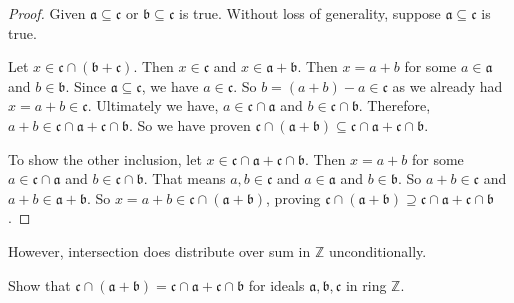 \begin{proof}
    Given \(\mathfrak{a} \subseteq \mathfrak{c}\) or \(\mathfrak{b} \subseteq \mathfrak{c}\) is true. Without loss of generality, suppose  \(\mathfrak{a} \subseteq \mathfrak{c}\) is true.

    Let \(x \in \mathfrak{c}  \cap (\mathfrak{b} + \mathfrak{c})\). Then \(x \in \mathfrak{c}\) and \(x \in \mathfrak{a} + \mathfrak{b}\). Then \(x = a + b\) for some  \(a \in \mathfrak{a}\) and \(b \in \mathfrak{b}\). Since \(\mathfrak{a} \subseteq \mathfrak{c}\), we have \(a \in \mathfrak{c}\). So \(b = (a+b) - a \in \mathfrak{c}\) as we already had \(x = a+b \in \mathfrak{c}\). Ultimately we have, \(a \in \mathfrak{c} \cap \mathfrak{a}\) and \(b \in \mathfrak{c} \cap \mathfrak{b}\). Therefore, \(a + b \in \mathfrak{c} \cap \mathfrak{a} + \mathfrak{c} \cap \mathfrak{b}\). So we have proven  \(\mathfrak{c} \cap (\mathfrak{a} + \mathfrak{b}) \subseteq \mathfrak{c} \cap \mathfrak{a} + \mathfrak{c} \cap \mathfrak{b}\).

    To show the other inclusion, let \(x \in \mathfrak{c} \cap \mathfrak{a} + \mathfrak{c} \cap \mathfrak{b}\). Then \(x = a + b\) for some  \(a \in \mathfrak{c} \cap \mathfrak{a}\) and \(b \in \mathfrak{c} \cap \mathfrak{b}\). That means \(a, b \in \mathfrak{c}\) and \(a \in \mathfrak{a}\) and \(b \in \mathfrak{b}\). So \(a + b \in \mathfrak{c}\) and \(a + b \in \mathfrak{a} + \mathfrak{b}\). So \(x =  a+b  \in \mathfrak{c} \cap \mathfrak{(\mathfrak{a}+\mathfrak{b})}\), proving \(\mathfrak{c} \cap (\mathfrak{a} + \mathfrak{b}) \supseteq \mathfrak{c} \cap \mathfrak{a} + \mathfrak{c} \cap \mathfrak{b}\).
\end{proof}
However, intersection does distribute over sum in \(\mathbb{Z}\) unconditionally.
\begin{exercise}\label{exercise:gcdlcmidentity2}
    Show that \(\mathfrak{c} \cap (\mathfrak{a} + \mathfrak{b}) = \mathfrak{c} \cap \mathfrak{a} + \mathfrak{c} \cap \mathfrak{b}\) for ideals \(\mathfrak{a}, \mathfrak{b}, \mathfrak{c}\) in ring \(\mathbb{Z}\).
\end{exercise}
